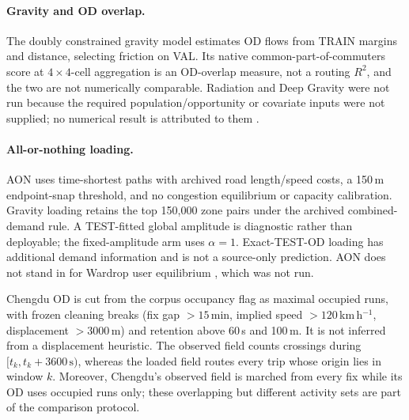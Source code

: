 \paragraph{Gravity and OD overlap.} The doubly constrained gravity model estimates OD flows from TRAIN margins and distance, selecting friction on VAL. Its native common-part-of-commuters score at $4\times4$-cell aggregation is an OD-overlap measure, not a routing $R^2$, and the two are not numerically comparable. Radiation and Deep Gravity were not run because the required population/opportunity or covariate inputs were not supplied; no numerical result is attributed to them \cite{simini2012universal,simini2021deepgravity}.

\paragraph{All-or-nothing loading.} AON uses time-shortest paths with archived road length/speed costs, a 150\,m endpoint-snap threshold, and no congestion equilibrium or capacity calibration. Gravity loading retains the top 150,000 zone pairs under the archived combined-demand rule. A TEST-fitted global amplitude is diagnostic rather than deployable; the fixed-amplitude arm uses $\alpha=1$. Exact-TEST-OD loading has additional demand information and is not a source-only prediction. AON does not stand in for Wardrop user equilibrium \cite{wardrop1952}, which was not run.

Chengdu OD is cut from the corpus occupancy flag as maximal occupied runs, with frozen cleaning breaks (fix gap $>15$\,min, implied speed $>120$\,km\,h$^{-1}$, displacement $>3000$\,m) and retention above 60\,s and 100\,m. It is not inferred from a displacement heuristic. The observed field counts crossings during $[t_k,t_k+3600\,\mathrm{s})$, whereas the loaded field routes every trip whose origin lies in window $k$. Moreover, Chengdu's observed field is marched from every fix while its OD uses occupied runs only; these overlapping but different activity sets are part of the comparison protocol.


